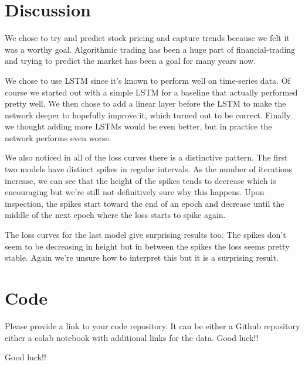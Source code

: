 \documentclass{article}
\begin{document}
\section{Discussion}

We chose to try and predict stock pricing and capture trends because we felt it was a worthy goal. Algorithmic trading has been a huge part of financial-trading and trying to predict the market has been a goal for many years now. 

We chose to use LSTM since it's known to perform well on time-series data. Of course we started out with a simple LSTM for a baseline that actually performed pretty well. We then chose to add a linear layer before the LSTM to make the network deeper to hopefully improve it, which turned out to be correct. Finally we thought adding more LSTMs would be even better, but in practice the network performs even worse. 

We also noticed in all of the loss curves there is a distinctive pattern. The first two models have distinct spikes in regular intervals. As the number of iterations increase, we can see that the height of the spikes tends to decrease which is encouraging but we're still not definitively sure why this happens. Upon inspection, the spikes start toward the end of an epoch and decrease until the middle of the next epoch where the loss starts to spike again.

The loss curves for the last model give surprising results too. The spikes don't seem to be decreasing in height but in between the spikes the loss seems pretty stable. Again we're unsure how to interpret this but it is a surprising result. 




\section{Code}

Please provide a link to your code repository. It can be either a Github repository either a colab notebook with additional links for the data.
Good luck!!

Good luck!!
%
%
\end{document}
